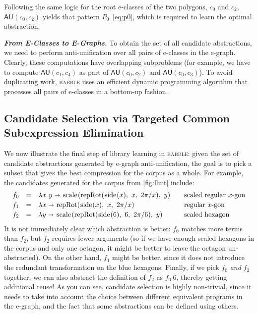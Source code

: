 \documentclass[acmsmall,screen,nonacm,review=false,timestamp=false]{acmart}
\newcommand{\emphbf}[1]{\emph{\textbf{#1}\xspace}}
\newcommand{\mypara}[1]{\smallskip\noindent\emphbf{#1.}\xspace}
\newcommand{\tname}[1]{\textsc{#1}\xspace}
\newcommand{\tool}{\tname{babble}}
\newcommand{\au}{\mathsf{AU}}
\newcommand{\bnd}{\ \mathbf{\shortrightarrow}\ }
\begin{document}
Following the same logic for the root e-classes of the two polygons, $c_0$ and $c_2$,
  $\au(c_0, c_2)$ yields that pattern $P_0$~\eqref{eq:p0},
  which is required to learn the optimal abstraction.




\mypara{From E-Classes to E-Graphs}
To obtain the set of all candidate abstractions,
we need to perform anti-unification over all pairs of e-classes in the e-graph.
Clearly, these computations have overlapping subproblems
(for example, we have to compute $\au(c_1, c_4)$ 
as part of $\au(c_0, c_2)$ and  $\au(c_0, c_3)$).
To avoid duplicating work, \tool uses an efficient dynamic programming algorithm
that processes all pairs of e-classes in a bottom-up fashion.

\subsection{Candidate Selection via Targeted Common Subexpression Elimination}

We now illustrate the final step of library learning in \tool:
given the set of candidate abstractions generated by e-graph anti-unification,
the goal is to pick a subset that gives the best compression for the corpus as a whole.
For example, the candidates generated for the corpus from \autoref{fig:llmt} include:
\[ \begin{array}{rcll}
f_0 &=& \lambda x\ y \bnd \scale{\repRot{\pSide{x}}{x}{2\pi/x}}{y} &\quad \text{scaled regular $x$-gon} \\[2pt]
f_1 &=& \lambda x \bnd \repRot{\pSide{x}}{x}{2\pi/x} &\quad \text{regular $x$-gon} \\[2pt]
f_2 &=& \lambda y \bnd \scale{\repRot{\pSide{6}}{6}{2\pi/6}}{y} &\quad \text{scaled hexagon}
\end{array} \]
It is not immediately clear which abstraction is better:
  $f_0$ matches more terms than $f_2$,
  but $f_2$ requires fewer arguments
  (so if we have enough scaled hexagons in the corpus and
  only one octagon, it might be better to leave the
  octagon un-abstracted).
On the other hand,
  $f_1$ might be better,
  since it does not introduce the
  redundant transformation on the blue hexagons.
Finally,
  if we pick $f_0$ \emph{and} $f_2$ together,
  we can also abstract the definition of
  $f_2$ as $f_0\ 6$, thereby getting additional reuse!
As you can see,
  candidate selection is highly non-trivial,
  since it needs to take into account the
  choice between different equivalent programs in the e-graph, and the fact that some abstractions can be defined using others.
\end{document}
